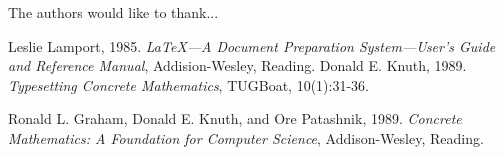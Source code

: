 \documentclass[journal]{IEEEtran}
\begin{document}
The authors would like to thank...


\ifCLASSOPTIONcaptionsoff
  \newpage
\fi





%
%
%


\begin{thebibliography}{9}
 Leslie Lamport, 1985. \emph{\LaTeX---A Document
Preparation System---User’s Guide and Reference Manual},
Addision-Wesley, Reading.
 Donald E. Knuth, 1989. \emph{Typesetting Concrete
Mathematics}, TUGBoat, 10(1):31-36.

 Ronald L. Graham, Donald E. Knuth, and Ore
Patashnik, 1989. \emph{Concrete Mathematics: A Foundation for
Computer Science}, Addison-Wesley, Reading.
\end{thebibliography}
% 







\end{document}
